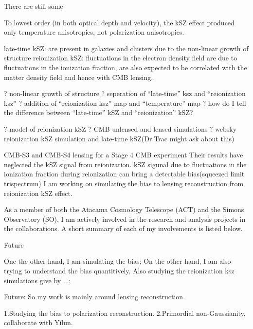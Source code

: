 \documentclass[12pt, notitlepage, onecolumn, amsmath, amssymb, aps]{revtex4-1}
\begin{document}
There are still some 

To lowest order (in both optical depth and velocity), the kSZ effect produced only temperature anisotropies, not polarization anisotropies. 



late-time kSZ: are present in galaxies and clusters due to the non-linear growth of structure
reionization kSZ: fluctuations in the electron density field are due to fluctuations in the ionization fraction, are also expected to be correlated with the matter density field and hence with CMB lensing. 

? non-linear growth of structure
? seperation of ``late-time'' ksz and ``reionization ksz''
? addition of ``reionization ksz'' map and ``temperature'' map
? how do I tell the difference between ``late-time'' kSZ and ``reionization'' kSZ?

? model of reionization kSZ
? CMB unlensed and lensed simulations
? websky reionization kSZ simulation and late-time kSZ(Dr.Trac might ask about this)

CMB-S3 and CMB-S4 lensing 
for a Stage 4 CMB experiment
Their results have neglected the kSZ signal from reionization. 
kSZ sigunal due to fluctuations in the ionization fraction during reionization can bring a detectable bias(squeezed limit trispectrum)
I am working on simulating the bias to lensing reconstruction from reionization kSZ effect. 


As a member of both the Atacama Cosmology Telescope (ACT) and the
Simons Observatory (SO), I am actively involved in the research and
analysis projects in the collaborations. A short summary of each of my
involvements is listed below.


Future

One the other hand, I am simulating the bias; On the other hand, I am also trying to understand the bias quantitively. Also studying the reionization  ksz simulations give by ...;

Future:
So my work is mainly around lensing reconstruction.

1.Studying the bias to polarization reconstruction.
2.Primordial non-Gaussianity, collaborate with Yilun.



\end{document}
